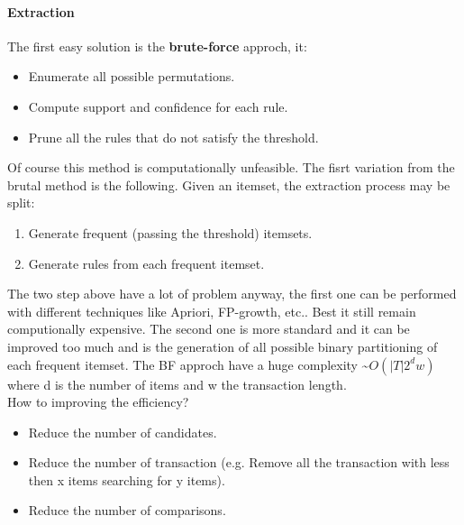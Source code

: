 \documentclass[12pt]{article}
\begin{document}
\paragraph{Extraction} The first easy solution is the \textbf{brute-force} approch, it:
\begin{itemize}
  \item Enumerate all possible permutations.
  \item Compute support and confidence for each rule.
  \item Prune all the rules that do not satisfy the threshold.
\end{itemize}
Of course this method is computationally unfeasible. The fisrt variation from the brutal method is the following. Given an itemset, the extraction process may be split:
\begin{enumerate}
  \item Generate frequent (passing the threshold) itemsets.
  \item Generate rules from each frequent itemset.
\end{enumerate}
The two step above have a lot of problem anyway, the first one can be performed with different techniques like Apriori, FP-growth, etc.. Best it still remain computionally expensive. The second one is more standard and it can be improved too much and is the generation of all possible binary partitioning of each frequent itemset. The BF approch have a huge complexity \textasciitilde $ O(|T| 2^d w)$ where d is the number of items and w the transaction length.\\
How to improving the efficiency?
\begin{itemize}
  \item Reduce the number of candidates.
  \item Reduce the number of transaction (e.g. Remove all the transaction with less then x items searching for y items).
  \item Reduce the number of comparisons.
\end{itemize}
\end{document}
